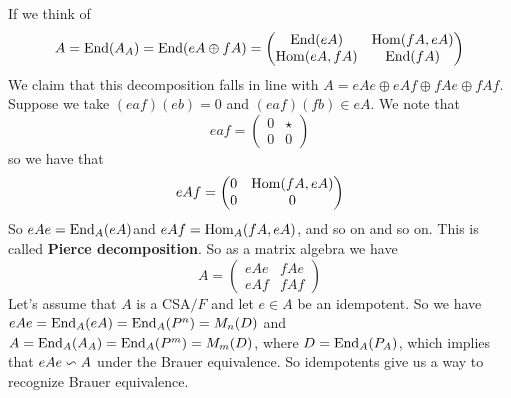 If we think of $$A = \operatorname{End}(A_A) = \operatorname{End}(eA \oplus fA) = \begin{pmatrix}
\operatorname{End} (eA) & \operatorname{Hom}(fA , eA) \\ \operatorname{Hom}(eA,fA) & \operatorname{End}(fA)
\end{pmatrix}$$
We claim that this decomposition falls in line with 
$A = eAe \oplus eAf \oplus fAe \oplus fAf.$
Suppose we take $(eaf)(eb) = 0$ and $(eaf)(fb) \in eA$. We note that 
$$eaf = \begin{pmatrix}
0 & \star \\ 0 & 0 
\end{pmatrix}$$
so we have that 
$$eAf = \begin{pmatrix}
0 & \operatorname{Hom}(fA,eA) \\ 0 & 0 
\end{pmatrix}$$
So $eAe = \operatorname{End}_A(eA)$and $eAf = \operatorname{Hom}_A(fA,eA)$, and so on and so on. This is called \textbf{Pierce decomposition}. So as a matrix algebra we have
$$A = \begin{pmatrix}
eAe & fAe \\ eAf & fAf
\end{pmatrix}$$
Let's assume that $A$ is a CSA$/F$ and let $e \in A$ be an idempotent. So we have $eAe = \operatorname{End}_A(eA) = \operatorname{End}_A(P^n) = M_n(D)$ and $A = \operatorname{End}_A(A_A) = \operatorname{End}_A(P^m) = M_m(D)$, where $D = \operatorname{End}_A(P_A)$, which implies that $eAe \backsim A$ under the Brauer equivalence. So idempotents give us a way to recognize Brauer equivalence. 

